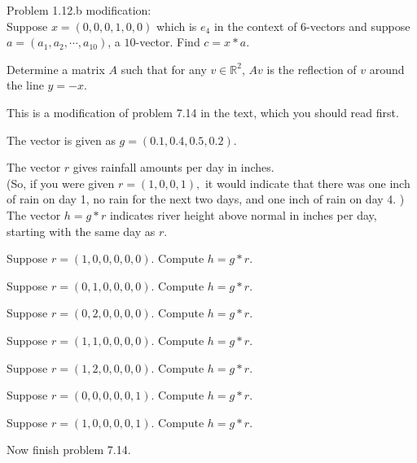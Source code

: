 \documentclass[minion]{homework}
\newcommand{\Reals}{\mathbb{R}}
\begin{document}
Problem 1.12.b modification: \\

Suppose $x=(0,0,0,1,0,0)$ which is $e_4$ in the context of 6-vectors and suppose $a=(a_1,a_2, \cdots, a_{10})$, a $10$-vector. Find $c=x*a.$


\begin{problems}

\problem Determine a matrix $A$ such that for any $v\in \Reals^2$, 
$Av$ is the reflection of $v$ around the line $y=-x$.

\problem This is a modification of problem 7.14 in the text, which
you should read first.

The vector is given as $g=(0.1, 0.4, 0.5, 0.2)$.  

The vector $r$ gives rainfall amounts per day in inches.  \\

(So, if you were given 
$r=(1,0,0,1),$ it would indicate that there was one inch of rain on day 1, no rain for the next two days,
and one inch of rain on day 4.  )\\

The vector $h= g*r$ indicates river height above normal in inches
per day, starting with the same day as $r$.

\begin{subproblems}
    \item Suppose $r=(1,0,0,0,0,0)$.  Compute $h=g*r$.
    \item Suppose $r=(0,1,0,0,0,0)$.  Compute $h=g*r$.
    \item Suppose $r=(0,2,0,0,0,0)$.  Compute $h=g*r$.
    \item Suppose $r=(1,1,0,0,0,0)$.  Compute $h=g*r$.
    \item Suppose $r=(1,2,0,0,0,0)$.  Compute $h=g*r$.
    \item Suppose $r=(0,0,0,0,0,1)$.  Compute $h=g*r$.
    \item Suppose $r=(1,0,0,0,0,1)$.  Compute $h=g*r$.
    \item Now finish problem 7.14.
\end{subproblems}

\end{problems}
\end{document}
